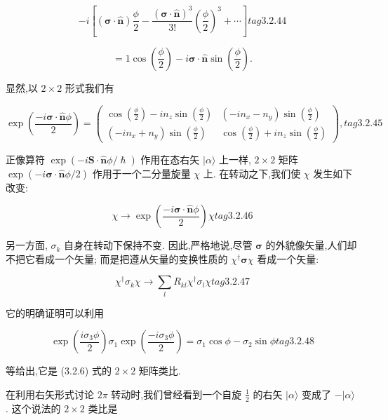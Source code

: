 $$
- i\left\lbrack {\left( {\mathbf{\sigma } \cdot \widehat{\mathbf{n}}}\right) \frac{\phi }{2} - \frac{{\left( \mathbf{\sigma } \cdot \widehat{\mathbf{n}}\right) }^{3}}{3!}{\left( \frac{\phi }{2}\right) }^{3} + \cdots }\right\rbrack tag{3. 2.44}
$$

$$
= 1\cos \left( \frac{\phi }{2}\right) - i\mathbf{\sigma } \cdot \widehat{\mathbf{n}}\sin \left( \frac{\phi }{2}\right) .
$$

显然,以 $2 \times 2$ 形式我们有

$$
\exp \left( \frac{-i\mathbf{\sigma } \cdot \widehat{\mathbf{n}}\phi }{2}\right) = \left( \begin{array}{ll} \cos \left( \frac{\phi }{2}\right) - i{n}_{z}\sin \left( \frac{\phi }{2}\right) & \left( {-i{n}_{x} - {n}_{y}}\right) \sin \left( \frac{\phi }{2}\right) \\ \left( {-i{n}_{x} + {n}_{y}}\right) \sin \left( \frac{\phi }{2}\right) & \cos \left( \frac{\phi }{2}\right) + i{n}_{z}\sin \left( \frac{\phi }{2}\right) \end{array}\right) , tag{3. 2.45}
$$

正像算符 $\exp \left( {-i\mathbf{S} \cdot \widehat{\mathbf{n}}\phi /\hslash }\right)$ 作用在态右矢 $|\alpha \rangle$ 上一样, $2 \times 2$ 矩阵 $\exp \left( {-i\mathbf{\sigma } \cdot \widehat{\mathbf{n}}\phi /2}\right)$ 作用于一个二分量旋量 $\chi$ 上. 在转动之下,我们使 $\chi$ 发生如下改变:

$$
\chi \rightarrow \exp \left( \frac{-i\mathbf{\sigma } \cdot \widehat{\mathbf{n}}\phi }{2}\right) \chi tag{3.2.46}
$$

另一方面, ${\sigma }_{k}$ 自身在转动下保持不变. 因此,严格地说,尽管 $\mathbf{\sigma }$ 的外貌像矢量,人们却不把它看成一个矢量; 而是把遵从矢量的变换性质的 ${\chi }^{ \dagger }\mathbf{\sigma }\chi$ 看成一个矢量:

$$
{\chi }^{ \dagger }{\sigma }_{k}\chi \rightarrow \mathop{\sum }\limits_{l}{R}_{kl}{\chi }^{ \dagger }{\sigma }_{l}\chi tag{3.2.47}
$$

它的明确证明可以利用

$$
\exp \left( \frac{i{\sigma }_{3}\phi }{2}\right) {\sigma }_{1}\exp \left( \frac{-i{\sigma }_{3}\phi }{2}\right) = {\sigma }_{1}\cos \phi - {\sigma }_{2}\sin \phi tag{3. 2.48}
$$

等给出,它是 (3.2.6) 式的 $2 \times 2$ 矩阵类比.

在利用右矢形式讨论 ${2\pi }$ 转动时,我们曾经看到一个自旋 $\frac{1}{2}$ 的右矢 $|\alpha \rangle$ 变成了 $- |\alpha \rangle$ . 这个说法的 $2 \times 2$ 类比是

